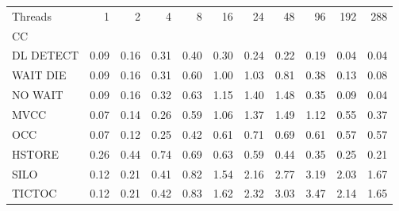 \begin{tabular}{lrrrrrrrrrr}
\toprule
Threads &  1   &  2   &  4   &  8   &  16  &  24  &  48  &  96  &  192 &  288 \\
CC        &      &      &      &      &      &      &      &      &      &      \\
\midrule
DL DETECT & 0.09 & 0.16 & 0.31 & 0.40 & 0.30 & 0.24 & 0.22 & 0.19 & 0.04 & 0.04 \\
WAIT DIE  & 0.09 & 0.16 & 0.31 & 0.60 & 1.00 & 1.03 & 0.81 & 0.38 & 0.13 & 0.08 \\
NO WAIT   & 0.09 & 0.16 & 0.32 & 0.63 & 1.15 & 1.40 & 1.48 & 0.35 & 0.09 & 0.04 \\
MVCC      & 0.07 & 0.14 & 0.26 & 0.59 & 1.06 & 1.37 & 1.49 & 1.12 & 0.55 & 0.37 \\
OCC       & 0.07 & 0.12 & 0.25 & 0.42 & 0.61 & 0.71 & 0.69 & 0.61 & 0.57 & 0.57 \\
HSTORE    & 0.26 & 0.44 & 0.74 & 0.69 & 0.63 & 0.59 & 0.44 & 0.35 & 0.25 & 0.21 \\
SILO      & 0.12 & 0.21 & 0.41 & 0.82 & 1.54 & 2.16 & 2.77 & 3.19 & 2.03 & 1.67 \\
TICTOC    & 0.12 & 0.21 & 0.42 & 0.83 & 1.62 & 2.32 & 3.03 & 3.47 & 2.14 & 1.65 \\
\bottomrule
\end{tabular}
